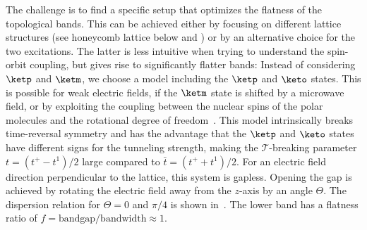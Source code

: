
The challenge is to find a specific setup that optimizes the flatness of the topological bands.
This can be achieved either by focusing on different lattice structures (see honeycomb lattice below and ) or by an alternative choice for the two excitations.
The latter is less intuitive when trying to understand the spin-orbit coupling, but gives rise to significantly flatter bands: Instead of considering $\ketp$ and $\ketm$, we choose a model including the $\ketp$ and $\keto$ states.
This is possible for weak electric fields, if the $\ketm$ state is shifted by a microwave field, or by exploiting the coupling between the nuclear spins of the polar molecules and the rotational degree of freedom~\cite{Ospelkaus2010,Yan2013}.
This model intrinsically breaks time-reversal symmetry and has the advantage that the $\ketp$ and $\keto$ states have different signs for the tunneling strength, making the $\mathcal{T}$-breaking parameter $t=(t^+-t^1)/2$ large compared to $\bar{t}=(t^++t^1)/2$. %
For an electric field direction perpendicular to the lattice, this system is gapless.
Opening the gap is achieved by rotating the electric field away from the $z$-axis by an angle $\Theta$.
The dispersion relation for $\Theta=0$ and $\pi/4$ is shown in~.
The lower band has a flatness ratio of $f = \text{bandgap}/\text{bandwidth} \approx 1$.


